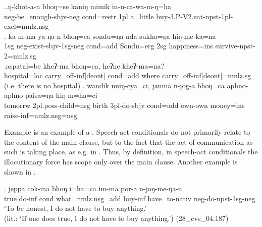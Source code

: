 \ex.\ag.\label{ex-ngkhotan}ŋ-khot-a-n  bhoŋ=se          kaniŋ   mimik    in-u-ca-wa-m-ŋ=ha\\
{\sc neg-}be\_enough{\sc [3sg]-sbjv-neg} {\sc cond=restr} {\sc 1pl} a\_little buy{\sc -3.P-V2.eat-npst-1pl-excl=nmlz.nsg}\\
 
\bg. ka  m-ma-ya-ŋa-n bhoŋ=ca  sondu=ŋa    nda sukha=ŋa   hiŋ-me-ka=na\\
{\sc 1sg} {\sc neg-}exist{\sc -sbjv-1sg-neg} {\sc cond=add} Sondu{\sc =erg} {\sc 2sg} happiness{\sc =ins} survive{\sc -npst-2=nmlz.sg}\\
 
\bg.aspatal=be     kheʔ-ma    bhoŋ=ca,       heʔne kheʔ-ma=na?\\
hospital{\sc =loc} carry\_off{\sc -inf[deont]} {\sc cond=add} where carry\_off{\sc -inf[deont]=nmlz.sg} \\
 (i.e. there is no hospital) 
\bg. wandik nniŋ-cya=ci, jʌnma n-jog-a bhoŋ=ca   aphno-aphno paisa=ŋa hiŋ-m=ha=ci\\
tomorrw {\sc 2pl.poss-}child{\sc =nsg} birth  {\sc 3pl-}do{\sc -sbjv} {\sc cond=add} own-own money{\sc =ins} raise{\sc -inf=nmlz.nsg=nsg}\\
 

Example \Last[c] is an example of a  \citep[267]{Thompsonetal2007_Adverbial}. Speech-act conditionals do not primarily relate to the content of the main clause, but to the fact that the act of communication as such is taking place, as e.g. in . Thus, by definition, in  speech-act conditionals the illocutionary force has scope only over the main clause. Another example is shown in \Next. 

\exg.	jeppa cok-ma  bhoŋ  i=ha=ca                        im-ma  por-a          n-joŋ-me-ŋa-n\\
		true  do{\sc -inf} {\sc cond}  what={\sc nmlz.nsg=add} buy{\sc -inf} have\_to{\sc -nativ} {\sc neg-}do{\sc -npst-1sg-neg}\\
		‘To be honest, I do not have to buy anything.’\\
		(lit.: ‘If one does true, I do not have to buy anything.’) (28\_cvs\_04.187)

